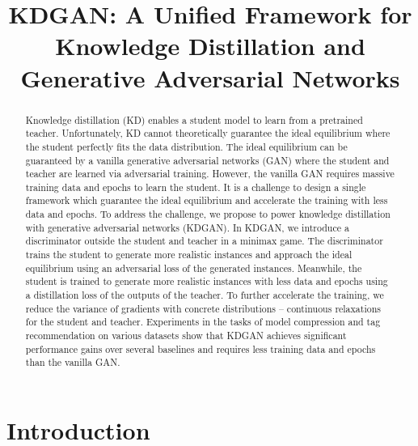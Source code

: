 \documentclass{article}
\title{KDGAN: A Unified Framework for Knowledge Distillation and Generative Adversarial Networks}
\author{
}
\newcommand{\bo}[1]{}
\newcommand{\bo}[1]{{\color{cyan}[Bo: #1]}}
\begin{document}

\maketitle


\begin{abstract}
Knowledge distillation (KD) enables a student model to learn from a pretrained teacher.
Unfortunately, KD cannot theoretically guarantee the ideal equilibrium \bo{is there non-ideal equilibrium?} where the student perfectly fits the data distribution.
The ideal equilibrium can be guaranteed by a vanilla generative adversarial networks (GAN) where the student and teacher are learned via adversarial training.
However, the vanilla GAN requires massive training data and epochs to learn the student.
It is a challenge to design a single framework which guarantee the ideal equilibrium and accelerate the training with less data and epochs.
To address the challenge, we propose to power knowledge distillation with generative adversarial networks (KDGAN).
In KDGAN, we introduce a discriminator outside the student and teacher in a minimax game.
The discriminator trains the student to generate more realistic instances and approach the ideal equilibrium using an adversarial loss of the generated instances.
Meanwhile, the student is trained to generate more realistic instances with less data and epochs using a distillation loss of the outputs of the teacher.
To further accelerate the training, we reduce the variance of gradients with concrete distributions -- continuous relaxations for the student and teacher.
Experiments in the tasks of model compression and tag recommendation on various datasets show that KDGAN achieves significant performance gains over several baselines and requires less training data and epochs than the vanilla GAN.
\end{abstract}


\section{Introduction}
\end{document}
